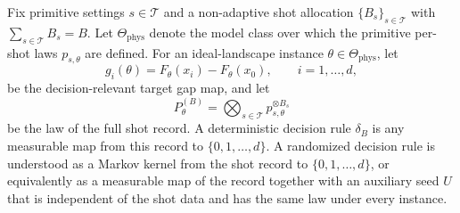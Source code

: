 \documentclass[a4paper,onecolumn,unpublished,nopdfoutputerror]{quantumarticle}
\theoremstyle{plain}
\theoremstyle{definition}
\newcommand{\1}{\mathbf{1}}
\begin{document}
Fix primitive settings $s\in\mathcal T$ and a non-adaptive shot allocation
$\{B_s\}_{s\in\mathcal T}$ with $\sum_{s\in\mathcal T}B_s=B$.  Let $\Theta_{\mathrm{phys}}$ denote
the model class over which the primitive per-shot laws $p_{s,\theta}$ are defined.
For an ideal-landscape instance $\theta\in\Theta_{\mathrm{phys}}$, let
\begin{equation}
    g_i(\theta)=F_\theta(x_i)-F_\theta(x_0),
    \qquad i=1,\ldots,d,
\end{equation}
be the decision-relevant target gap map, and let
\begin{equation}
    P^{(B)}_\theta=\bigotimes_{s\in\mathcal T}p_{s,\theta}^{\otimes B_s}
\end{equation}
be the law of the full shot record.  A deterministic decision rule $\delta_B$ is any
measurable map from this record to $\{0,1,\ldots,d\}$.  A randomized decision
rule is understood as a Markov kernel from the shot record to
$\{0,1,\ldots,d\}$, or equivalently as a measurable map of the record together
with an auxiliary seed $U$ that is independent of the shot data and has the same
law under every instance.
\end{document}
